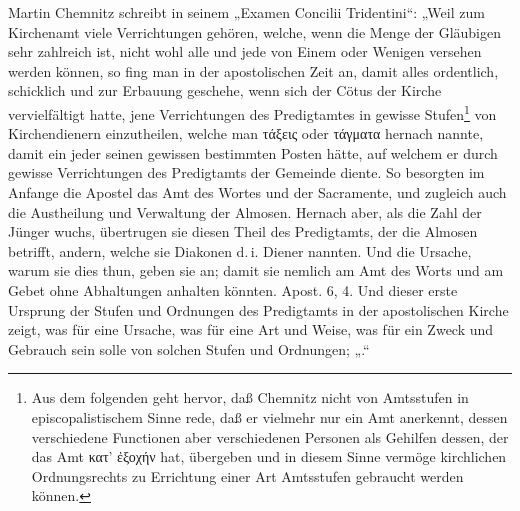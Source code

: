 Martin Chemnitz schreibt in seinem „Examen Concilii Tridentini“: „Weil zum Kirchenamt viele Verrichtungen gehören, welche, wenn die Menge der Gläubigen sehr zahlreich ist, nicht wohl alle und jede von Einem oder Wenigen versehen werden können, so fing man in der apostolischen Zeit an, damit alles ordentlich, schicklich und zur Erbauung geschehe, wenn sich der Cötus der Kirche vervielfältigt hatte, jene Verrichtungen des Predigtamtes in gewisse Stufen\footnote{Aus dem folgenden geht hervor, daß Chemnitz nicht von Amtsstufen in episcopalistischem Sinne rede, daß er vielmehr nur ein Amt anerkennt, dessen verschiedene Functionen aber verschiedenen Personen als Gehilfen dessen, der das Amt κατ’ ἐξοχήν hat, übergeben und in diesem Sinne vermöge kirchlichen Ordnungsrechts zu Errichtung einer Art Amtsstufen gebraucht werden können.} von Kirchendienern einzutheilen, welche man τάξεις oder τάγματα hernach nannte, damit ein jeder seinen gewissen bestimmten Posten hätte, auf welchem er durch gewisse Verrichtungen des Predigtamts der Gemeinde diente. So besorgten im Anfange die Apostel das Amt des Wortes und der Sacramente, und zugleich auch die Austheilung und Verwaltung der Almosen. Hernach aber, als die Zahl der Jünger wuchs, übertrugen sie diesen Theil des Predigtamts, der die Almosen betrifft, andern, welche sie Diakonen d.\,i. Diener nannten. Und
die Ursache, warum sie dies thun, geben sie an; damit sie nemlich am Amt des Worts und am Gebet ohne Abhaltungen anhalten könnten. Apost. 6, 4. Und dieser erste Ursprung der Stufen und Ordnungen des Predigtamts in der apostolischen Kirche zeigt, was für eine Ursache, was für eine Art und Weise, was für ein Zweck und Gebrauch sein solle von solchen Stufen und Ordnungen; „.“

